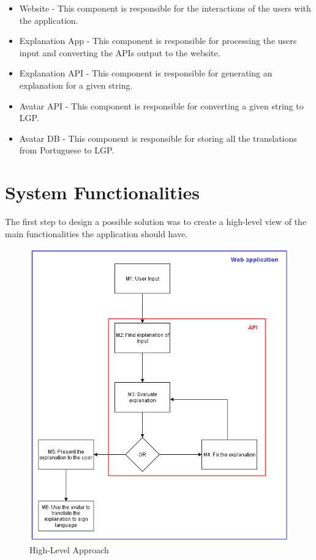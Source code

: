\begin{itemize}
    \item Website - This component is responsible for the interactions of the users with the application.
    \item Explanation App - This component is responsible for processing the users input and converting the APIs output to the website.
    \item Explanation API - This component is responsible for generating an explanation for a given string.
    \item Avatar API - This component is responsible for converting a given string to \gls{LGP}.
    \item Avatar DB - This component is responsible for storing all the translations from Portuguese to \gls{LGP}.
\end{itemize}

\section{System Functionalities}

The first step to design a possible solution was to create a high-level view of the main functionalities the application should have.

\begin{figure}[H]
\centering
\includegraphics[scale=0.5]{ch4/assets/diagram1_2.png}
\caption[High-Level Approach]{High-Level Approach}
\label{fig:Diagram1}
\end{figure}

